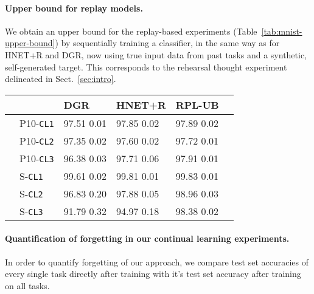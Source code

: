 \documentclass{article}
\begin{document}
\paragraph{Upper bound for replay models.} We obtain an upper bound for the replay-based experiments (Table~\ref{tab:mnist-upper-bound}) by sequentially training a classifier, in the same way as for HNET+R and DGR, now using true input data from past tasks and a synthetic, self-generated target. This corresponds to the rehearsal thought experiment delineated in Sect.~\ref{sec:intro}.
\begin{table*}[ht!]
 \centering
  \caption{Task-averaged test accuracy ( SEM, ) on the permuted (`P10') and split (`S') MNIST experiments. For HNET+R and DGR+distill \citep{van_de_ven_three_2019} the classification network is trained sequentially on data from the current task and replayed data from all previous tasks. Our HNET+R comes close to saturating the corresponding replay upper bound RPL-UB.}
  \begin{small}
  \begin{tabular}{llp{1.62cm}p{1.62cm}p{1.65cm}p{1.65cm}} \toprule
     & & \textbf{DGR} & \textbf{HNET+R} & \textbf{RPL-UB} \\ \midrule \midrule
    \multirow{3}{*}{}
    & P10-\texttt{CL1} & 97.51   0.01 & 97.85   0.02 & 97.89   0.02 \\
        &  P10-\texttt{CL2} & 97.35   0.02& 97.60   0.02 & 97.72   0.01\\
    & P10-\texttt{CL3} & 96.38   0.03 & 97.71   0.06 & 97.91   0.01\\
    \midrule
    \multirow{3}{*}{} 
    & S-\texttt{CL1} &  99.61   0.02 & 99.81   0.01 & 99.83   0.01 \\
    & S-\texttt{CL2} &  96.83   0.20 & 97.88   0.05 & 98.96   0.03 \\
    & S-\texttt{CL3} &  91.79   0.32 & 94.97   0.18 & 98.38   0.02 \\
    \bottomrule
  \end{tabular}
  \label{tab:mnist-upper-bound}
  \end{small}
\end{table*}

\paragraph{Quantification of forgetting in our continual learning experiments.}

In order to quantify forgetting of our approach, we compare test set accuracies of every single task directly after training with it's test set accuracy after training on all tasks.
\end{document}

